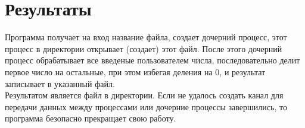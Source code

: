 \section{Результаты}

Программа получает на вход название файла, создает дочерний процесс, этот процесс в директории открывает (создает) этот файл. После этого дочерний процесс обрабатывает все введеные пользователем числа, последовательно делит первое число на остальные, при этом избегая деления на 0, и результат записывает в указанный файл.\\
Результатом является файл в директории. Если не удалось создать канал для передачи данных между процессами или дочерние процессы завершились, то программа безопасно прекращает свою работу.

